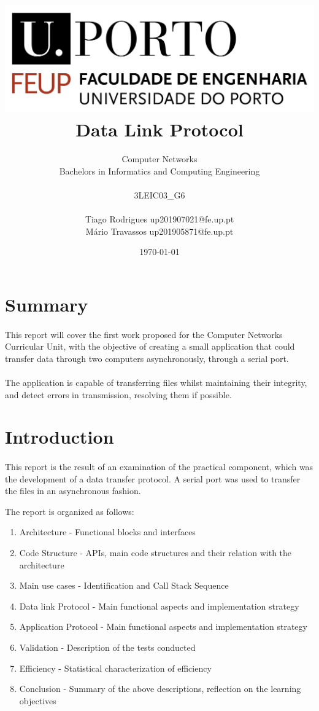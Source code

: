 \documentclass[11pt]{article}
\title{\includegraphics[scale=0.3]{logo.png} \\ \textbf{Data Link Protocol}}
\author{Computer Networks\\ Bachelors in Informatics and Computing Engineering \\ \\ 3LEIC03\_G6 \\ \\ Tiago
Rodrigues up201907021@fe.up.pt \\ Mário Travassos up201905871@fe.up.pt  }
\date{\today}
\begin{document}
\maketitle

\newpage

\section*{Summary}

\paragraph{}This report will cover the first work proposed for the Computer Networks Curricular Unit, with
the objective of creating a small application that could transfer data through two computers asynchronously,
through a serial port.

\paragraph{}The application is capable of transferring files whilst maintaining their integrity, and detect errors in transmission, resolving them if possible.

\section*{Introduction}

\paragraph{}This report is the result of an examination of the practical component, which was the
development of a data transfer protocol. A serial port was used to transfer the files in an asynchronous
fashion.

The report is organized as follows:

\begin{enumerate}
  \item{Architecture - Functional blocks and interfaces}
  \item{Code Structure - APIs, main code structures and their relation with the architecture}
  \item{Main use cases - Identification and Call Stack Sequence}
  \item{Data link Protocol - Main functional aspects and implementation strategy}
  \item{Application Protocol - Main functional aspects and implementation strategy }
  \item{Validation - Description of the tests conducted}
  \item{Efficiency - Statistical characterization of efficiency}
  \item{Conclusion - Summary of the above descriptions, reflection on the learning objectives}
\end{enumerate}
\end{document}

